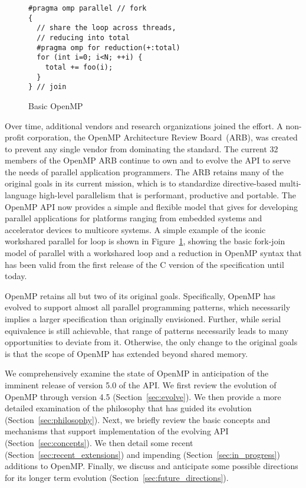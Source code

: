 \begin{figure}
\begin{verbatim}
#pragma omp parallel // fork
{
  // share the loop across threads,
  // reducing into total
  #pragma omp for reduction(+:total)
  for (int i=0; i<N; ++i) {
    total += foo(i);
  }
} // join
\end{verbatim}
\caption{Basic OpenMP\label{fig:basic}}
\end{figure}

Over time, additional vendors and research organizations joined the effort.  A
non-profit corporation, the OpenMP Architecture Review Board~(ARB), was created
to prevent any single vendor from dominating the standard. The current 32
members of the OpenMP ARB continue to own and to evolve the API to serve the
needs of parallel application programmers. The ARB retains many of the original
goals in its current mission, which is to standardize directive-based
multi-language high-level parallelism that is performant, productive and
portable. The OpenMP API now provides a simple and flexible model that gives
for developing parallel applications for platforms ranging from embedded
systems and accelerator devices to multicore systems.  A simple example of the
iconic workshared parallel for loop is shown in Figure~\ref{fig:basic}, showing
the basic fork-join model of parallel with a workshared loop and a reduction in
OpenMP syntax that has been valid from the first release of the C version of
the specification until today.

OpenMP retains all but two of its original goals. Specifically, OpenMP has 
evolved to support almost all parallel programming patterns, which necessarily
implies a larger specification than originally envisioned. Further, while 
serial equivalence is still achievable, that range of patterns necessarily 
leads to many opportunities to deviate from it. Otherwise, the only change 
to the original goals is that the scope of OpenMP has extended beyond 
shared memory. 

We comprehensively examine the state of OpenMP in anticipation of the imminent 
release of version 5.0 of the API. We first review the evolution of OpenMP 
through version 4.5 (Section~\ref{sec:evolve}). We then provide a more 
detailed examination of the philosophy that has guided its evolution 
(Section~\ref{sec:philosophy}). Next, we briefly review the basic concepts 
and mechanisms that support implementation of the evolving API 
(Section~\ref{sec:concepts}). We then detail some recent 
(Section~\ref{sec:recent_extensions}) and impending 
(Section~\ref{sec:in_progress}) additions to OpenMP. Finally, we discuss
and anticipate some possible directions for its longer term evolution
(Section~\ref{sec:future_directions}).
